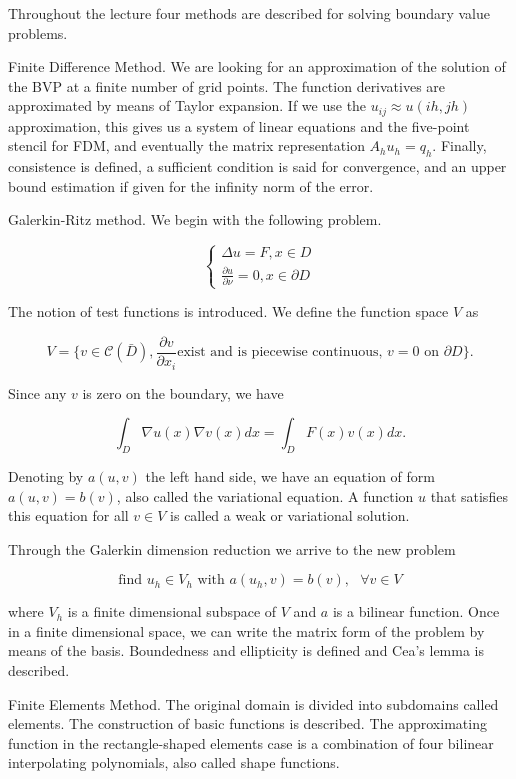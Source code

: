\documentclass{article}
\begin{document}
\begin{outline}[enumerate]

Throughout the lecture four methods are described for solving boundary value problems.

\1 Finite Difference Method. We are looking for an approximation of the solution of the BVP at a finite number of grid points. The function derivatives are approximated by means of Taylor expansion. If we use the $u_{ij} \approx u(ih, jh)$ approximation, this gives us a system of linear equations and the five-point stencil for FDM, and eventually the matrix representation $A_h u_h = q_h$. Finally, consistence is defined, a sufficient condition is said for convergence, and an upper bound estimation if given for the infinity norm of the error.

\1 Galerkin-Ritz method. We begin with the following problem.

\[
   \begin{cases}
               \Delta u = F, x \in D\\
               \frac{\partial u}{\partial \nu} = 0, x \in \partial D
   \end{cases}
\]

The notion of test functions is introduced. We define the function space $V$ as

\[ V = \{v \in \mathcal{C}(\bar{D}), \frac{\partial v}{\partial x_i} \text{exist and is piecewise continuous, } v = 0 \text{ on } \partial D \}.\]

Since any $v$ is zero on the boundary,  we have

\[ \int_D \nabla u(x) \nabla v(x) dx = \int_D F(x)v(x)dx.\]

Denoting by $a(u, v)$ the left hand side, we have an equation of form $a(u,v) = b(v)$, also called the variational equation. A function $u$ that satisfies this equation for all $v \in V$ is called a weak or variational solution.

Through the Galerkin dimension reduction we arrive to the new problem

\[\text{find } u_h \in V_h \text{ with } a(u_h,v) = b(v), \text{ }\forall v \in V\]

where $V_h$ is a finite dimensional subspace of $V$ and $a$ is a bilinear function. Once in a finite dimensional space, we can write the matrix form of the problem by means of the basis. Boundedness and ellipticity is defined and Cea's lemma is described.

\1 Finite Elements Method. The original domain is divided into subdomains called elements. The construction of basic functions is described. The approximating function in the rectangle-shaped elements case is a combination of four bilinear interpolating polynomials, also called shape functions.


\end{outline}
\end{document}
